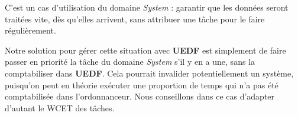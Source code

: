 	C'est un cas d'utilisation du domaine \textit{System} : garantir que les données seront traitées vite, dès qu'elles arrivent, 
	sans attribuer une tâche pour le faire régulièrement.\newline
	
	Notre solution pour gérer cette situation avec \textbf{UEDF} est simplement de faire passer en priorité 
	la tâche du domaine \textit{System} s'il y en a une, sans la comptabiliser dans \textbf{UEDF}. 
	Cela pourrait invalider potentiellement un système, puisqu'on peut en théorie 
	exécuter une proportion de temps qui n'a pas été comptabilisée dans l'ordonnanceur. 
	Nous conseillons dans ce cas d'adapter d'autant le WCET des tâches.
